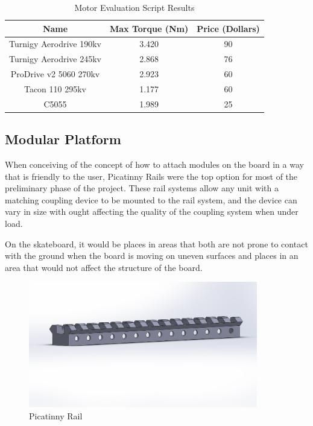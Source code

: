\documentclass[titlepage, letterpaper,12pt]{article}
\begin{document}
\begin{table}[]
    \centering
    \begin{tabular}{ |c | c | c| }
        \hline
        \textbf{Name} & \textbf{Max Torque (Nm)} & \textbf{Price (Dollars)} \\
        \hline \hline
        Turnigy Aerodrive 190kv & 3.420 & 90  \\
         \hline
        Turnigy Aerodrive 245kv & 2.868 & 76  \\
         \hline
        ProDrive v2 5060 270kv & 2.923 & 60  \\
        \hline
        Tacon 110 295kv & 1.177 & 60  \\
         \hline
        C5055 & 1.989  & 25  \\
        \hline
    \end{tabular}
    \caption{Motor Evaluation Script Results}
    \label{MotorTable}
\end{table}

\subsection{Modular Platform}
When conceiving of the concept of how to attach modules on the board in a way that is friendly to the user, Picatinny Rails were the top option for most of the preliminary phase of the project. These rail systems allow any unit with a matching coupling device to be mounted to the rail system, and the device can vary in size with ought affecting the quality of the coupling system when under load.

On the skateboard, it would be places in areas that both are not prone to contact with the ground when the board is moving on uneven surfaces and places in an area that would not affect the structure of the board.

\begin{figure}[h]
    \centering
    \includegraphics[width=10cm]{figs/Picatinny_Rail.JPG}
    \caption{Picatinny Rail}
    \label{fig:picTiny}
\end{figure}
\end{document}
